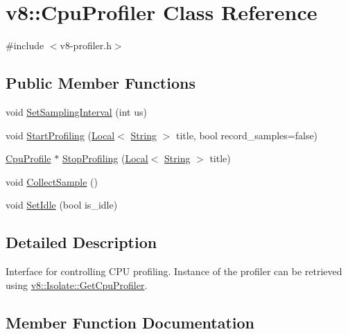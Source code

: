 \hypertarget{classv8_1_1CpuProfiler}{}\section{v8\+:\+:Cpu\+Profiler Class Reference}
\label{classv8_1_1CpuProfiler}


{\ttfamily \#include $<$v8-\/profiler.\+h$>$}

\subsection*{Public Member Functions}
\begin{DoxyCompactItemize}
\item 
void \hyperlink{classv8_1_1CpuProfiler_ac5b05c72fb899e20adfa7f8cc57f21fb}{Set\+Sampling\+Interval} (int us)
\item 
void \hyperlink{classv8_1_1CpuProfiler_a7a9b75d3d7285d90344e1b8f14e97076}{Start\+Profiling} (\hyperlink{classv8_1_1Local}{Local}$<$ \hyperlink{classv8_1_1String}{String} $>$ title, bool record\+\_\+samples=false)
\item 
\hyperlink{classv8_1_1CpuProfile}{Cpu\+Profile} $\ast$ \hyperlink{classv8_1_1CpuProfiler_a34acaa3b0e40cf2f92e9e6acb3fb5de7}{Stop\+Profiling} (\hyperlink{classv8_1_1Local}{Local}$<$ \hyperlink{classv8_1_1String}{String} $>$ title)
\item 
void \hyperlink{classv8_1_1CpuProfiler_ac497150fc1bced99d37d0ac1e932defa}{Collect\+Sample} ()
\item 
void \hyperlink{classv8_1_1CpuProfiler_a68e6da6f9ff4a0d3bde505f378a9a7fa}{Set\+Idle} (bool is\+\_\+idle)
\end{DoxyCompactItemize}


\subsection{Detailed Description}
Interface for controlling C\+PU profiling. Instance of the profiler can be retrieved using \hyperlink{classv8_1_1Isolate_a7eb415d9210d912aa57877ab6416fec8}{v8\+::\+Isolate\+::\+Get\+Cpu\+Profiler}. 

\subsection{Member Function Documentation}
